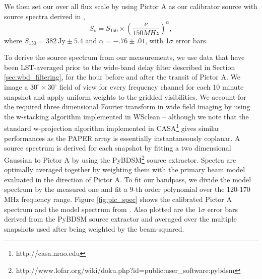 \documentclass[twocolumn,numberedappendix]{emulateapj} \shorttitle{New Limits on the 21 cm Power Spectrum at $z=8.4$}
\begin{document}
We then set our over all flux scale by using Pictor A as our calibrator source
with source spectra derived in \citet{jacobs_et_al2013}, 
\begin{equation}
    S_{\nu} = S_{150}\times\left(\frac{\nu}{150MHz}\right)^{\alpha},
\end{equation}
where $S_{150} = 382~\text{Jy} \pm 5.4$ and $\alpha = -.76 \pm .01$, with
1$\sigma$ error bars.



To derive the source spectrum from our measurements, we use data that have been
LST-averaged prior to the wide-band delay filter described in Section
\ref{sec:wbd_filtering}, for the hour before and after the transit of Pictor A.
We image a $30^\circ \times 30^\circ$ field of view for every frequency channel
for each 10 minute snapshot and apply uniform weights to the gridded
visibilities. We account for the required three dimensional Fourier transform in
wide field imaging by using the w-stacking algorithm implemented in WSclean
\citep{offringa_et_al2014} – although we note that the standard w-projection
algorithm implemented in CASA\footnote{http://casa.nrao.edu} gives similar
performances as the PAPER array is essentially instantaneously coplanar.  A
source spectrum is derived for each snapshot by fitting a two dimensional
Gaussian to Pictor A by using the
PyBDSM\footnote{http://www.lofar.org/wiki/doku.php?id=public:user\_software:pybdsm}
source extractor. Spectra are optimally averaged together by weighting them with
the primary beam model evaluated in the direction of Pictor A. To fit our
bandpass, we divide the model spectrum by the measured one and fit a 9-th order
polynomial over the 120-170 MHz frequency range. Figure \ref{fig:pic_spec} shows
the calibrated Pictor A spectrum and the model spectrum from
\citet{jacobs_et_al2013}. Also plotted are the $1\sigma$ error bars derived from the PyBDSM source extractor and averaged over the multiple snapshots used after being weighted by the beam-squared.
\end{document}
